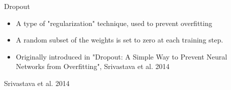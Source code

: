 \documentclass[9pt, aspectratio=169]{beamer}
\begin{document}
\begin{frame}
    {Dropout}
    \begin{itemize}
        \item A type of "regularization" technique, used to prevent overfitting
        \item A random subset of the weights is set to zero at each training step.
        \item Originally introduced in "Dropout: A Simple Way to Prevent Neural Networks from Overfitting", Srivastava et al. 2014
    \end{itemize}

    \centering

    \footnotesize
    \raggedright
    Srivastava et al. 2014
\end{frame}
\end{document}
